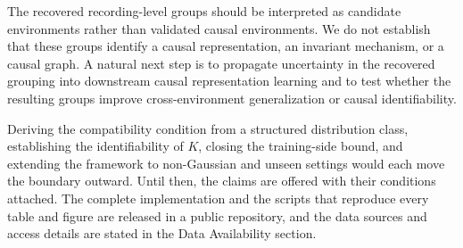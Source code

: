 The recovered recording-level groups should be interpreted as candidate
environments rather than validated causal environments. We do not
establish that these groups identify a causal representation, an
invariant mechanism, or a causal graph. A natural next step is to
propagate uncertainty in the recovered grouping into downstream causal
representation learning and to test whether the resulting groups improve
cross-environment generalization or causal identifiability.

Deriving the compatibility condition from a structured distribution
class, establishing the identifiability of \(K\), closing the
training-side bound, and extending the framework to non-Gaussian and
unseen settings would each move the boundary outward. Until then, the
claims are offered with their conditions attached. The complete
implementation and the scripts that reproduce every table and figure are
released in a public repository, and the data sources and access details
are stated in the Data Availability section.
